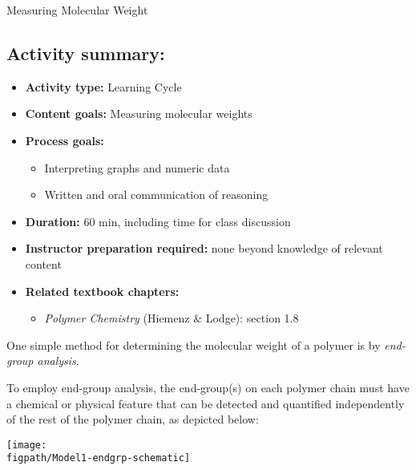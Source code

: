 \begin{activity}{Measuring Molecular Weight}
\begin{instructornotes}
	\subsection*{Activity summary:}
	\begin{itemize}
		\item \textbf{Activity type:} Learning Cycle
		\item \textbf{Content goals:} Measuring molecular weights
		\item \textbf{Process goals:} %
			\begin{itemize}
				\item Interpreting graphs and numeric data
				\item Written and oral communication of reasoning
			\end{itemize}
		\item \textbf{Duration:} 60 min, including time for class discussion
		\item \textbf{Instructor preparation required:} none beyond knowledge of relevant content
		\item \textbf{Related textbook chapters:}
			\begin{itemize}
				\item \emph{Polymer Chemistry} (Hiemenz \& Lodge): section 1.8
			\end{itemize}
	\end{itemize}
	
\end{instructornotes}




\begin{model}
\label{\labelbase:mdl:endgrpanalysis}

	One simple method for determining the molecular weight of a polymer is by \emph{end-group analysis}.
	
	To employ end-group analysis, the end-group(s) on each polymer chain must have a chemical or physical feature that can be detected and quantified independently of the rest of the polymer chain, as depicted below:
	
	\centerline{\texttt{[image: \\figpath/Model1-endgrp-schematic]}}


\end{model}
\end{activity}
